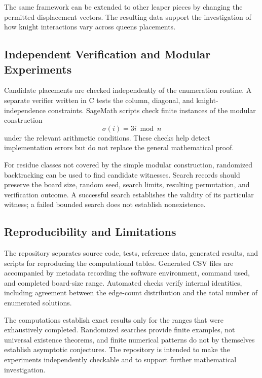 The same framework can be extended to other leaper pieces by changing the
permitted displacement vectors. The resulting data support the
investigation of how knight interactions vary across queens placements.

\subsection{Independent Verification and Modular Experiments}

Candidate placements are checked independently of the enumeration routine.
A separate verifier written in C tests the column, diagonal, and
knight-independence constraints. SageMath scripts check finite instances
of the modular construction
\[
\sigma(i)=3i\bmod n
\]
under the relevant arithmetic conditions. These checks help detect
implementation errors but do not replace the general mathematical proof.

For residue classes not covered by the simple modular construction,
randomized backtracking can be used to find candidate witnesses. Search
records should preserve the board size, random seed, search limits,
resulting permutation, and verification outcome. A successful search
establishes the validity of its particular witness; a failed bounded
search does not establish nonexistence.

\subsection{Reproducibility and Limitations}

The repository separates source code, tests, reference data, generated
results, and scripts for reproducing the computational tables. Generated
CSV files are accompanied by metadata recording the software environment,
command used, and completed board-size range. Automated checks verify
internal identities, including agreement between the edge-count
distribution and the total number of enumerated solutions.

The computations establish exact results only for the ranges that were
exhaustively completed. Randomized searches provide finite examples, not
universal existence theorems, and finite numerical patterns do not by
themselves establish asymptotic conjectures. The repository is intended
to make the experiments independently checkable and to support further
mathematical investigation.
